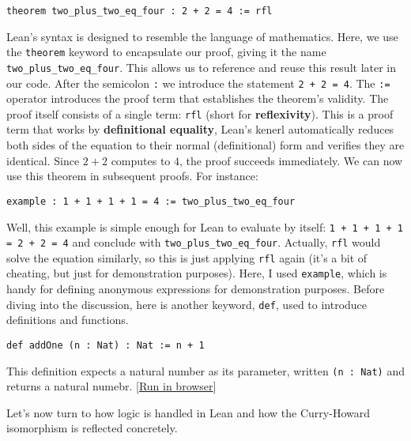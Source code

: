\begin{example}\mbox{}

\begin{lstlisting}[language=Lean]
theorem two_plus_two_eq_four : 2 + 2 = 4 := rfl
\end{lstlisting}

Lean's syntax is designed to resemble the language of mathematics. 
Here, we use the \lstinline[language=lean]|theorem| keyword to encapsulate our proof, 
giving it the name \lstinline[language=lean]|two_plus_two_eq_four|. 
This allows us to reference and reuse this result later in our code.
After the semicolon \lstinline[language=lean]|:| we introduce the
statement \lstinline[language=lean]|2 + 2 = 4|.
The \lstinline[language=lean]|:=| operator introduces the 
proof term that establishes the theorem's validity. 
The proof itself consists of a single term: \lstinline[language=lean]|rfl| 
(short for \textbf{reflexivity}). This is a proof term that works by 
\textbf{definitional equality}, Lean's kenerl automatically reduces both sides of the equation 
to their normal (definitional) form and verifies they are identical. 
Since $2 + 2$ computes to $4$, the proof succeeds immediately.
We can now use this theorem in subsequent proofs. For instance:
\begin{lstlisting}[language=Lean]
    example : 1 + 1 + 1 + 1 = 4 := two_plus_two_eq_four
\end{lstlisting}
Well, this example is simple enough for Lean to evaluate by itself:
\lstinline[language=lean]|1 + 1 + 1 + 1 = 2 + 2 = 4|
and conclude with \lstinline[language=lean]|two_plus_two_eq_four|. 
Actually, \lstinline[language=lean]|rfl| would solve the equation similarly, 
so this is just applying \lstinline[language=lean]|rfl| again (it's a bit of cheating, 
but just for demonstration purposes).
Here, I used \lstinline[language=lean]|example|, which is handy for defining anonymous 
expressions for demonstration purposes.
Before diving into the discussion, here is another keyword, \lstinline[language=lean]|def|, used to introduce definitions and functions.

\begin{lstlisting}[language=Lean]
    def addOne (n : Nat) : Nat := n + 1
\end{lstlisting}
This definition expects a natural number as its parameter, written \lstinline[language=lean]|(n : Nat)|
and returns a natural numebr.
[\href{https://live.lean-lang.org/\#codez=YOUR_ENCODED_URL_HERE}{Run in browser}]
\end{example}
Let's now turn to how logic is handled in Lean and how the Curry-Howard 
isomorphism is reflected concretely.


